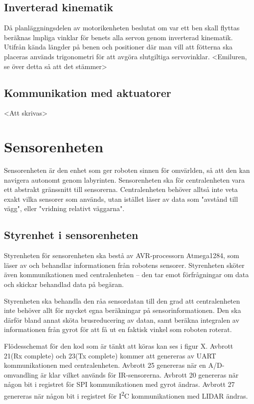 \documentclass[a4paper,titlepage,12pt]{article}
\newcommand{\itc}{I\textsuperscript{2}C}
\begin{document}
	\subsection{Inverterad kinematik}
	Då planläggningsdelen av motorikenheten beslutat om var ett ben skall flyttas beräknas  
	lmpliga vinklar för benets alla servon genom inverterad kinematik. Utifrån kända 
	längder på benen och positioner där man vill att fötterna ska placeras används 
	trigonometri för att avgöra slutgiltiga servovinklar. <Emiluren, se över detta så att det stämmer>

	\subsection{Kommunikation med aktuatorer}
	<Att skrivas>
	
	\section{Sensorenheten}
	
	Sensorenheten är den enhet som ger roboten sinnen för omvärlden, så att den
	kan navigera autonomt genom labyrinten. Sensorenheten ska för
	centralenheten vara ett abstrakt gränssnitt till sensorerna. Centralenheten
	behöver alltså inte veta exakt vilka sensorer som används, utan istället
	läser av data som "avstånd till vägg", eller "vridning relativt väggarna".

	\subsection{Styrenhet i sensorenheten}

	Styrenheten för sensorenheten ska bestå av AVR-processorn Atmega1284, som läser av och 
	behandlar informationen från robotens sensorer. Styrenheten sköter även
	kommunikationen med centralenheten -- den tar emot förfrågningar om data och
	skickar behandlad data på begäran.

	Styrenheten ska behandla den råa sensordatan till den grad att
	centralenheten inte behöver allt för mycket egna beräkningar på
	sensorinformationen. Den ska därför bland annat sköta brusreducering av
	datan, samt beräkna integralen av informationen från gyrot för att få ut en
	faktisk vinkel som roboten roterat. 

	Flödesschemat för den kod som är tänkt att köras kan ses i figur X. 
	Avbrott 21(Rx complete) och 23(Tx complete) kommer att genereras av UART kommunikationen 
	med centralenheten. 
	Avbrott 25 genereras när en A/D-omvandling är klar vilket används för IR-sensorerna. 
	Avbrott 20 genereras när någon bit i registret för SPI kommunikationen med gyrot
	ändras. 
	Avbrott 27 genereras när någon bit i registret för \itc{} kommunikationen med LIDAR
	ändras. 
\end{document}
